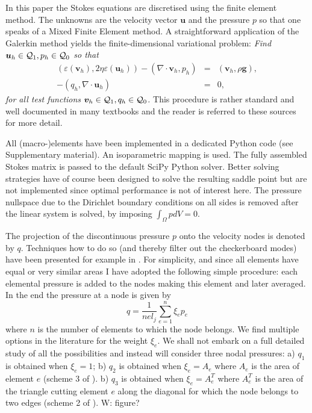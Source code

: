 \documentclass[a4paper,12pt]{article}
\begin{document}
In this paper the Stokes equations are discretised using the finite element method.
The unknowns are the velocity vector ${\bm u}$ and the pressure $p$ so that 
one speaks of a Mixed Finite Element method. 
A straightforward application of the Galerkin method yields the finite-dimensional 
variational problem: 
\textit{Find ${\bm u}_h\in {\cal Q}_1,p_h\in {\cal Q}_0$
so that
\begin{eqnarray}
\label{eq:discrete-formulation}
\left(\varepsilon(\bm v_h), 2\eta \varepsilon(\bm u_h)\right)  
- ( \nabla \cdot \bm v_h, p_h) &=&   ({\bm v}_h,\rho \bm g),\\
-(q_h,\nabla \cdot \bm u_h) &=& 0,
\end{eqnarray}
for all test functions ${\bm v}_h\in {\cal Q}_1, q_h\in {\cal Q}_0$.}
This procedure is rather standard and well documented in many 
textbooks \cite{grsa,dohu03,bobf13} and the reader is referred to these sources 
for more detail.

All (macro-)elements have been implemented in a dedicated Python code (see Supplementary material). 
An isoparametric mapping is used. 
The fully assembled Stokes matrix is passed to the default SciPy Python solver. 
Better solving strategies have of course 
been designed to solve the resulting saddle point \cite{begl05} but are not 
implemented since optimal performance is not of interest here.
The pressure nullspace due to the Dirichlet boundary conditions on all sides is removed 
after the linear system is solved, by imposing $\int_\Omega p dV= 0$.

The projection of the discontinuous pressure $p$ onto the velocity nodes is denoted by $q$. 
Techniques how to do so (and thereby filter out the checkerboard modes) have been presented 
for example in \cite{legs79,sagl81a,chpc95,thfb08}.
For simplicity, and since all elements have equal or very similar areas 
I have adopted the following simple procedure: each 
elemental pressure is added to the nodes making this element and later averaged.
In the end the pressure at a node is given by
\[
q = \frac{1}{nel_j} \sum_{e=1}^{n} \xi_e p_e
\]
where $n$ is the number of elements to which the node belongs.
We find multiple options in the literature for the weight $\xi_e$.
We shall not embark on a full detailed study of all the possibilities 
and instead will consider three nodal pressures:
a) $q_1$ is obtained when $\xi_e=1$; 
b) $q_2$ is obtained when $\xi_e=A_e$ where $A_e$ is the area of element $e$
(scheme 3 of \cite{sagl81a}).
b) $q_3$ is obtained when $\xi_e=A_e^T$ where $A_e^T$ is the area of the triangle cutting
element $e$ along the diagonal for which the node belongs to two edges (scheme 2 of \cite{sagl81a}).
{\color{red} W: figure?}
\end{document}
